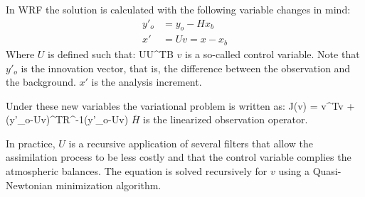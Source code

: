 In WRF the solution is calculated with the following variable changes in mind:
\begin{align}
y'_o &= y_o - Hx_b\\
x'&=Uv=x-x_b
\end{align}
Where $U$ is defined such that:
\be
UU^T\approx B
\ee
$v$ is a so-called control variable. Note that $y'_o$ is the innovation vector, that is, the difference between the observation and the background. $x'$ is the analysis increment.

Under these new variables the variational problem is written as:
\be 
J(v) = v^Tv + (y'_o-Uv)^TR^{-1}(y'_o-Uv)
\ee
$\overline{H}$ is the linearized observation operator.

In practice, $U$ is a recursive application of several filters that allow the assimilation process to be less costly and that the control variable complies the atmospheric balances. The equation is solved recursively for $v$ using a Quasi-Newtonian minimization algorithm.  

